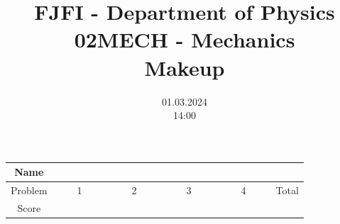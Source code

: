 \documentclass[a4paper,12pt]{article}
\title{{\Large FJFI - Department of Physics} \\ 
              02MECH - Mechanics \\ 
{\Large \textbf{Makeup}}\vspace{-1cm}}
\date{01.03.2024 \\ 14:00}
\author{}
\begin{document}
\maketitle
\vspace{-1.5em}

\begin{center}
    \renewcommand{\arraystretch}{2}
    \begin{tabular}{ |c|c|c|c|c|c| } 
        \hline
        Name& \multicolumn{5}{c|}{\phantom{~~~~~~~~~~~~~~~~~~~~~~~~~~~~~~~~~~~~~~~~~~~~~~~~~~~~~~~~~~~~~~~~~~~~~~~~~~~~~~~}}\\
        \hline
        Problem & ~~~~1~~~~ & ~~~~2~~~~ & ~~~~3~~~~ & ~~~~4~~~~ & Total \\ 
        \hline
        Score & &  & & & \\
        \hline
    \end{tabular}
\end{center}

\vspace*{1cm}







\end{document}
